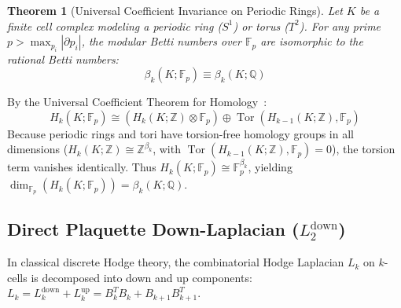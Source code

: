 \documentclass[conference]{IEEEtran}
\begin{document}
\newtheorem{theorem}{Theorem}
\begin{theorem}[Universal Coefficient Invariance on Periodic Rings]
Let $K$ be a finite cell complex modeling a periodic ring ($S^1$) or torus ($T^2$). For any prime $p > \max_{p_i} |\partial p_i|$, the modular Betti numbers over $\mathbb{F}_p$ are isomorphic to the rational Betti numbers:
\begin{equation}
\beta_k(K; \mathbb{F}_p) \equiv \beta_k(K; \mathbb{Q})
\label{eq:uct}
\end{equation}
\end{theorem}
\begin{IEEEproof}
By the Universal Coefficient Theorem for Homology~\cite{hatcher2002algebraic}:
\begin{equation}
H_k(K; \mathbb{F}_p) \cong \left( H_k(K; \mathbb{Z}) \otimes \mathbb{F}_p \right) \oplus \operatorname{Tor}\left(H_{k-1}(K; \mathbb{Z}), \mathbb{F}_p\right)
\end{equation}
Because periodic rings and tori have torsion-free homology groups in all dimensions ($H_k(K; \mathbb{Z}) \cong \mathbb{Z}^{\beta_k}$, with $\operatorname{Tor}(H_{k-1}(K; \mathbb{Z}), \mathbb{F}_p) = 0$), the torsion term vanishes identically. Thus $H_k(K; \mathbb{F}_p) \cong \mathbb{F}_p^{\beta_k}$, yielding $\dim_{\mathbb{F}_p}(H_k(K; \mathbb{F}_p)) = \beta_k(K; \mathbb{Q})$.
\end{IEEEproof}

\subsection{Direct Plaquette Down-Laplacian ($L_2^{\text{down}}$)}
In classical discrete Hodge theory, the combinatorial Hodge Laplacian $L_k$ on $k$-cells is decomposed into down and up components: $L_k = L_k^{\text{down}} + L_k^{\text{up}} = B_k^T B_k + B_{k+1} B_{k+1}^T$.
\end{document}
